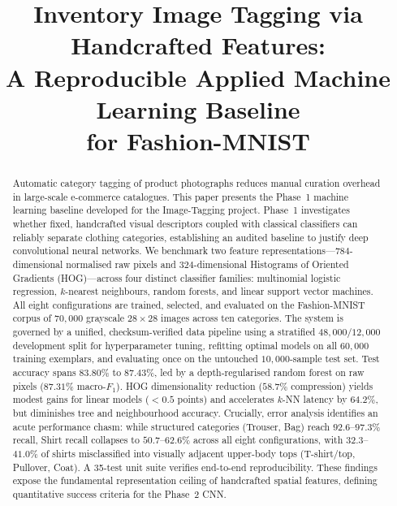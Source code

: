 \documentclass[conference]{IEEEtran}
\begin{document}
\title{Inventory Image Tagging via Handcrafted Features:\\
A Reproducible Applied Machine Learning Baseline\\
for Fashion-MNIST}

\author{
}

\maketitle

\begin{abstract}
Automatic category tagging of product photographs reduces manual curation
overhead in large-scale e-commerce catalogues. This paper presents the
Phase~1 machine learning baseline developed for the Image-Tagging project.
Phase~1 investigates whether fixed, handcrafted visual descriptors coupled
with classical classifiers can reliably separate clothing categories,
establishing an audited baseline to justify deep convolutional neural
networks. We benchmark two feature representations---$784$-dimensional
normalised raw pixels and $324$-dimensional Histograms of Oriented
Gradients (HOG)---across four distinct classifier families: multinomial
logistic regression, $k$-nearest neighbours, random forests, and linear
support vector machines. All eight configurations are trained, selected,
and evaluated on the Fashion-MNIST corpus of $70{,}000$ grayscale
$28\times 28$ images across ten categories. The system is governed by a
unified, checksum-verified data pipeline using a stratified
$48{,}000/12{,}000$ development split for hyperparameter tuning, refitting
optimal models on all $60{,}000$ training exemplars, and evaluating once
on the untouched $10{,}000$-sample test set. Test accuracy spans
$83.80\%$ to $87.43\%$, led by a depth-regularised random forest on raw
pixels ($87.31\%$ macro-$F_1$). HOG dimensionality reduction ($58.7\%$
compression) yields modest gains for linear models ($<0.5$ points) and
accelerates $k$-NN latency by $64.2\%$, but diminishes tree and
neighbourhood accuracy. Crucially, error analysis identifies an acute
performance chasm: while structured categories (Trouser, Bag)
reach $92.6$--$97.3\%$ recall, Shirt recall collapses to
$50.7$--$62.6\%$ across all eight configurations, with $32.3$--$41.0\%$
of shirts misclassified into visually adjacent upper-body tops
(T-shirt/top, Pullover, Coat). A 35-test unit suite verifies end-to-end
reproducibility. These findings expose the fundamental representation
ceiling of handcrafted spatial features, defining quantitative success
criteria for the Phase~2 CNN.
\end{abstract}
\end{document}
